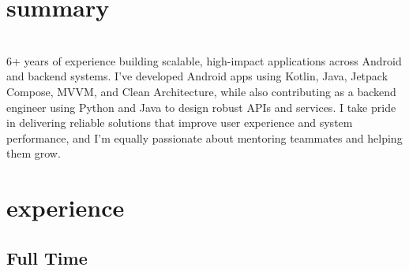 \documentclass[a4paper,nocolors]{friggeri-cv}
\begin{document}
\section{summary}
\vspace{1em}
\\
6+ years of experience building scalable, high-impact applications across Android and backend systems. I’ve developed Android apps using Kotlin, Java, Jetpack Compose, MVVM, and Clean Architecture, while also contributing as a backend engineer using Python and Java to design robust APIs and services. I take pride in delivering reliable solutions that improve user experience and system performance, and I’m equally passionate about mentoring teammates and helping them grow.
\vspace{0.5em}


\section{experience}

\subsection{Full Time}
\end{document}

